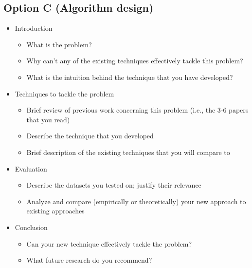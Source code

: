 \documentclass{article}
\begin{document}
\subsection*{Option C (Algorithm design)}
\begin{itemize}
\item Introduction
	\begin{itemize}
	\item What is the problem?
	\item Why can't any of the existing techniques effectively tackle this problem?
	\item What is the intuition behind the technique that you have developed?
	\end{itemize}
\item Techniques to tackle the problem
	\begin{itemize}
	\item Brief review of previous work concerning this problem (i.e., the 3-6 papers that you read)
	\item Describe the technique that you developed
	\item Brief description of the existing techniques that you will compare to
	\end{itemize}
\item Evaluation
	\begin{itemize}
	\item Describe the datasets you tested on; justify their relevance
	\item Analyze and compare (empirically or theoretically) your new approach to existing approaches
	\end{itemize}
\item Conclusion
	\begin{itemize}
	\item Can your new technique effectively tackle the problem?
	\item What future research do you recommend?
	\end{itemize}
\end{itemize}
\end{document}
